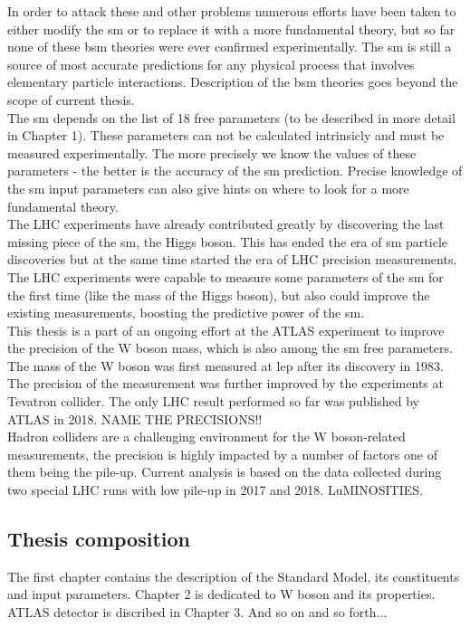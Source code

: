 In order to attack these and other problems numerous efforts have been taken to either modify the \gls{sm} or to replace it with a more fundamental theory, but so far none of these \gls{bsm} theories were ever confirmed experimentally. The \gls{sm} is still a source of most accurate predictions for any physical process that involves elementary particle interactions. Description of the \gls{bsm} theories goes beyond the scope of current thesis. \\
The \gls{sm} depends on the list of 18 free parameters (to be described in more detail in Chapter 1). These parameters can not be calculated intrinsicly and must be measured experimentally. The more precisely we know the values of these parameters - the better is the accuracy of the \gls{sm} prediction. Precise knowledge of the \gls{sm} input parameters can also give hints on where to look for a more fundamental theory. \\
The LHC experiments have already contributed greatly by discovering the last missing piece of the \gls{sm}, the Higgs boson. This has ended the era of \gls{sm} particle discoveries but at the same time started the era of LHC precision measurements. The LHC experiments were capable to measure some parameters of the \gls{sm} for the first time (like the mass of the Higgs boson), but also could improve the existing measurements, boosting the predictive power of the \gls{sm}. \\
This thesis is a part of an ongoing effort at the ATLAS experiment to improve the precision of the W boson mass, which is also among the \gls{sm} free parameters. The mass of the W boson was first measured at \gls{lep} after its discovery in 1983. The precision of the measurement was further improved by the experiments at Tevatron collider. The only LHC result performed so far was published by ATLAS in 2018. NAME THE PRECISIONS!!\\
Hadron colliders are a challenging environment for the W boson-related measurements, the precision is highly impacted by a number of factors one of them being the pile-up. Current analysis is based on the data collected during two special LHC runs with low pile-up in 2017 and 2018.  LuMINOSITIES. 

\subsection{Thesis composition}
The first chapter contains the description of the Standard Model, its constituents and input parameters. Chapter 2 is dedicated to W boson and its properties. ATLAS detector is discribed in Chapter 3. And so on and so forth...